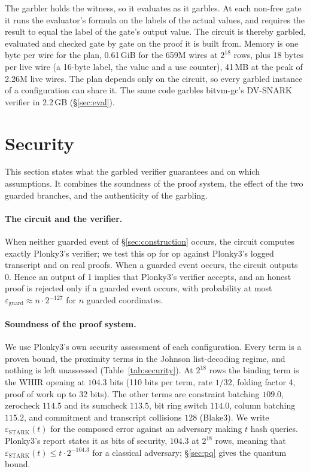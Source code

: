 \documentclass[11pt]{article}
\begin{document}
The garbler holds the witness, so it evaluates as it garbles. At each non-free
gate it runs the evaluator's formula on the labels of the actual values, and
requires the result to equal the label of the gate's output value. The circuit
is thereby garbled, evaluated and checked gate by gate on the proof it is built
from. Memory is one byte per wire for the plan, 0.61\,GiB for the 659M wires at
$2^{18}$ rows, plus 18 bytes per live wire (a 16-byte label, the value and a use
counter), 41\,MB at the peak of 2.26M live wires. The plan depends only on the circuit, so every garbled
instance of a configuration can share it. The same code
garbles bitvm-gc's DV-SNARK verifier in 2.2\,GB (\S\ref{sec:eval}).

\section{Security}\label{sec:security}

This section states what the garbled verifier guarantees and on which
assumptions. It combines the soundness of the proof system, the effect of the two
guarded branches, and the authenticity of the garbling.

\paragraph{The circuit and the verifier.} When neither guarded event of
\S\ref{sec:construction} occurs, the circuit computes exactly Plonky3's verifier;
we test this op for op against Plonky3's logged transcript and on real proofs.
When a guarded event occurs, the circuit outputs 0. Hence an output of 1 implies
that Plonky3's verifier accepts, and an honest proof is rejected only if a guarded
event occurs, with probability at most $\varepsilon_{\mathrm{guard}}\approx
n\cdot2^{-127}$ for $n$ guarded coordinates.

\paragraph{Soundness of the proof system.} We use Plonky3's own security
assessment of each configuration. Every term is a proven bound, the proximity
terms in the Johnson list-decoding regime, and nothing is left unassessed
(Table~\ref{tab:security}).
At $2^{18}$ rows the binding term is the WHIR opening at $104.3$ bits (110 bits per
term, rate $1/32$, folding factor 4, proof of work up to 32 bits). The other terms
are constraint batching $109.0$, zerocheck $114.5$ and its sumcheck $113.5$, bit
ring switch $114.0$, column batching $115.2$, and commitment and transcript
collisions $128$ (Blake3). We write $\varepsilon_{\mathrm{STARK}}(t)$ for the
composed error against an adversary making $t$ hash queries. Plonky3's report
states it as bits of security, $104.3$ at $2^{18}$ rows, meaning that
$\varepsilon_{\mathrm{STARK}}(t)\le t\cdot2^{-104.3}$ for a classical adversary; \S\ref{sec:pq} gives the quantum bound.
\end{document}

